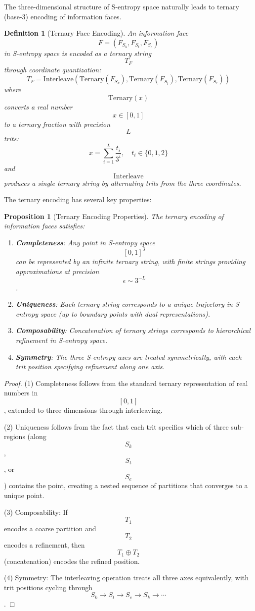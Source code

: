 \documentclass[11pt,twocolumn,a4paper]{article}
\newtheorem{definition}[theorem]{Definition}
\newtheorem{proposition}[theorem]{Proposition}
\theoremstyle{remark}
\begin{document}
The three-dimensional structure of S-entropy space naturally leads to ternary (base-3) encoding of information faces.

\begin{definition}[Ternary Face Encoding]
\label{def:ternary_face_encoding}
An information face $$F = (F_{S_k}, F_{S_t}, F_{S_e})$$ in S-entropy space is encoded as a ternary string $$T_F$$ through coordinate quantization:
$$
T_F = \mathrm{Interleave}\left(\mathrm{Ternary}(F_{S_k}), \mathrm{Ternary}(F_{S_t}), \mathrm{Ternary}(F_{S_e})\right)
$$
where $$\mathrm{Ternary}(x)$$ converts a real number $$x \in [0,1]$$ to a ternary fraction with precision $$L$$ trits:
$$
x = \sum_{i=1}^{L} \frac{t_i}{3^i}, \quad t_i \in \{0, 1, 2\}
$$
and $$\mathrm{Interleave}$$ produces a single ternary string by alternating trits from the three coordinates.
\end{definition}

The ternary encoding has several key properties:

\begin{proposition}[Ternary Encoding Properties]
\label{prop:ternary_properties}
The ternary encoding of information faces satisfies:
\begin{enumerate}
\item \textbf{Completeness}: Any point in S-entropy space $$[0,1]^3$$ can be represented by an infinite ternary string, with finite strings providing approximations at precision $$\epsilon \sim 3^{-L}$$.
\item \textbf{Uniqueness}: Each ternary string corresponds to a unique trajectory in S-entropy space (up to boundary points with dual representations).
\item \textbf{Composability}: Concatenation of ternary strings corresponds to hierarchical refinement in S-entropy space.
\item \textbf{Symmetry}: The three S-entropy axes are treated symmetrically, with each trit position specifying refinement along one axis.
\end{enumerate}
\end{proposition}

\begin{proof}
(1) Completeness follows from the standard ternary representation of real numbers in $$[0,1]$$, extended to three dimensions through interleaving.

(2) Uniqueness follows from the fact that each trit specifies which of three sub-regions (along $$S_k$$, $$S_t$$, or $$S_e$$) contains the point, creating a nested sequence of partitions that converges to a unique point.

(3) Composability: If $$T_1$$ encodes a coarse partition and $$T_2$$ encodes a refinement, then $$T_1 \oplus T_2$$ (concatenation) encodes the refined position.

(4) Symmetry: The interleaving operation treats all three axes equivalently, with trit positions cycling through $$S_k \to S_t \to S_e \to S_k \to \cdots$$.
\end{proof}
\end{document}
